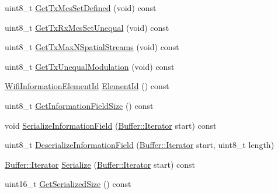 \begin{DoxyCompactItemize}
\item 
uint8\+\_\+t \hyperlink{classns3_1_1HtOperation_acccaa8c08a967561ca7806d9fd80163b}{Get\+Tx\+Mcs\+Set\+Defined} (void) const 
\item 
uint8\+\_\+t \hyperlink{classns3_1_1HtOperation_a73e77e34ec7d89b834294f2fd525d0f6}{Get\+Tx\+Rx\+Mcs\+Set\+Unequal} (void) const 
\item 
uint8\+\_\+t \hyperlink{classns3_1_1HtOperation_a3bf3ebccdbe120317c091e55ed587c89}{Get\+Tx\+Max\+N\+Spatial\+Streams} (void) const 
\item 
uint8\+\_\+t \hyperlink{classns3_1_1HtOperation_a315e8095aabdffd8c24b18b221bb4ab1}{Get\+Tx\+Unequal\+Modulation} (void) const 
\item 
\hyperlink{namespacens3_aeb185e0c8a60816016bca079f1420478}{Wifi\+Information\+Element\+Id} \hyperlink{classns3_1_1HtOperation_ab92c57230c97e298c31e580f32b7428f}{Element\+Id} () const 
\item 
uint8\+\_\+t \hyperlink{classns3_1_1HtOperation_a7611ac5b8a93ba3923bddc9e149da4f6}{Get\+Information\+Field\+Size} () const 
\item 
void \hyperlink{classns3_1_1HtOperation_a65fccd065c260f9eb3b93fa0f84ee337}{Serialize\+Information\+Field} (\hyperlink{classns3_1_1Buffer_1_1Iterator}{Buffer\+::\+Iterator} start) const 
\item 
uint8\+\_\+t \hyperlink{classns3_1_1HtOperation_a47d788083e3938358995e474d4d5d9ab}{Deserialize\+Information\+Field} (\hyperlink{classns3_1_1Buffer_1_1Iterator}{Buffer\+::\+Iterator} start, uint8\+\_\+t length)
\item 
\hyperlink{classns3_1_1Buffer_1_1Iterator}{Buffer\+::\+Iterator} \hyperlink{classns3_1_1HtOperation_a3ed9edb17e266a42436c1ab5def0cd49}{Serialize} (\hyperlink{classns3_1_1Buffer_1_1Iterator}{Buffer\+::\+Iterator} start) const 
\item 
uint16\+\_\+t \hyperlink{classns3_1_1HtOperation_a599960a520cccda4c4afa84880f19775}{Get\+Serialized\+Size} () const 
\end{DoxyCompactItemize}
